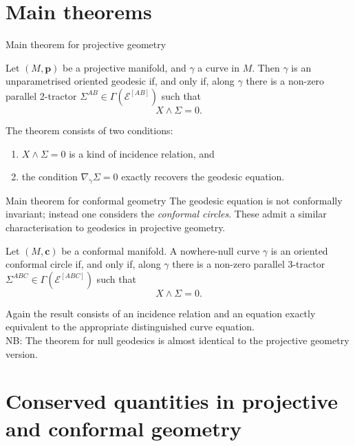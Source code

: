\documentclass{beamer}
\begin{document}
\section{Main theorems}

\begin{frame}{Main theorem for projective geometry}
  \begin{Theorem}
    Let \( (M,\bm{p}) \) be a projective manifold, and \( \gamma \) a curve in \(
    M \).
    Then \( \gamma \) is an unparametrised oriented geodesic if, and only if,
    along \( \gamma \) there is a non-zero parallel 2-tractor \( \Sigma^{A B}\in
    \Gamma\left( \mathcal{E}^{ [A B] }\right) \) such that
    \[
      X \wedge \Sigma = 0.
    \]
  \end{Theorem}
  \pause
  The theorem consists of two conditions:\\
  \begin{enumerate}
    \pause
    \item \( X \wedge \Sigma = 0\) is a kind of incidence relation, and
    \pause
    \item the condition \( \nabla_{\dot{\gamma}} \Sigma = 0 \) exactly recovers the geodesic equation.
  \end{enumerate}
\end{frame}

\begin{frame}{Main theorem for conformal geometry}
  The geodesic equation is not conformally invariant; instead one considers the
  \emph{conformal circles}.
  These admit a similar characterisation to geodesics in projective geometry.
  \pause
  \begin{Theorem}
    Let \( (M,\bm{c}) \) be a conformal manifold.
    A nowhere-null curve \( \gamma \) is an oriented conformal circle if, and
    only if, along \( \gamma \) there is a non-zero parallel 3-tractor \(
    \Sigma^{ABC} \in \Gamma(\mathcal{E}^{[ABC]}) \) such that
    \[
      X \wedge \Sigma = 0.
    \]
  \end{Theorem}
  \pause
  Again the result consists of an incidence relation and an equation exactly
  equivalent to the appropriate distinguished curve equation.
  \pause
  \hspace{1em}\\
  NB: The theorem for null geodesics is almost identical to the projective geometry version.
\end{frame}

\section{Conserved quantities in projective and conformal geometry}
\end{document}
